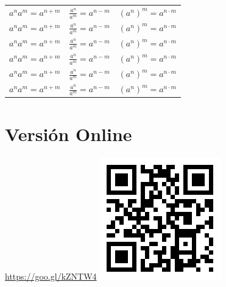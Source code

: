 \documentclass[a4paper,spanish,9pt]{extarticle}
\begin{document}
\begin{multicols*}{2}
\begin{tabular}{lll}
$a^n a^m = a^{n+m}$ & $\frac{a^n}{a^m} = a^{n-m}$ & $(a^n)^m = a^{n \cdot m}$\\
$a^n a^m = a^{n+m}$ & $\frac{a^n}{a^m} = a^{n-m}$ & $(a^n)^m = a^{n \cdot m}$\\
$a^n a^m = a^{n+m}$ & $\frac{a^n}{a^m} = a^{n-m}$ & $(a^n)^m = a^{n \cdot m}$\\
$a^n a^m = a^{n+m}$ & $\frac{a^n}{a^m} = a^{n-m}$ & $(a^n)^m = a^{n \cdot m}$\\
$a^n a^m = a^{n+m}$ & $\frac{a^n}{a^m} = a^{n-m}$ & $(a^n)^m = a^{n \cdot m}$\\
$a^n a^m = a^{n+m}$ & $\frac{a^n}{a^m} = a^{n-m}$ & $(a^n)^m = a^{n \cdot m}$
\end{tabular}




\section{Versión Online}

\url{https://goo.gl/kZNTW4} \includegraphics[width=0.15\columnwidth]{qr_chuletapot}





\end{multicols*}
\end{document}
